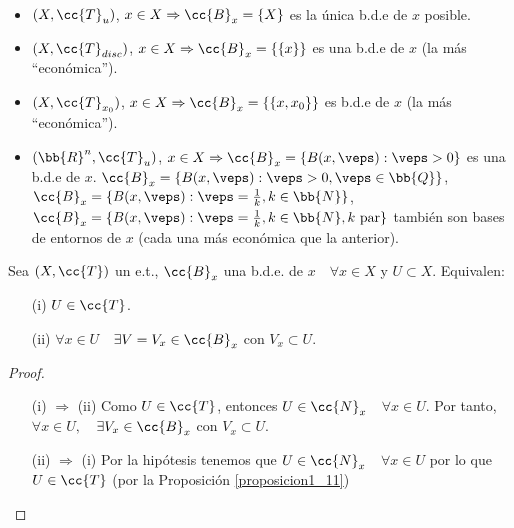 \begin{ejemplo}\
    \begin{itemize}
        \item $(X, \cc{T}_u)$, $x\in X\Rightarrow \cc{B}_x=\{X\}$ es la única b.d.e de $x$ posible.
        \item $(X, \cc{T}_{disc})$, $x \in X \Rightarrow \cc{B}_x=\{\{x\}\}$ es una b.d.e de $x$ (la más ``económica'').
        \item $(X, \cc{T}_{x_0})$, $x \in X \Rightarrow \cc{B}_x = \{\{x,x_0\}\}$ es b.d.e de $x$ (la más ``económica'').
        \item $(\bb{R}^n, \cc{T}_u)$, $x \in X\Rightarrow \cc{B}_x = \{B(x, \veps): \veps > 0\}$ es una b.d.e de $x$. $\cc{B}_x = \{B(x, \veps):\veps > 0 , \veps \in \bb{Q}\}$, $\cc{B}_x = \{B(x, \veps):\veps =\frac{1}{k}, k\in \bb{N}\}$, $\cc{B}_x = \{B(x, \veps):\veps =\frac{1}{k}, k\in \bb{N}, k\text{ par}\}$ también son bases de entornos de $x$ (cada una más económica que la anterior).
    \end{itemize}
    \endsquare
\end{ejemplo}

\begin{prop}
    Sea $(X,\cc{T})$ un e.t., $\cc{B}_x$ una b.d.e. de $x$\ \ $\forall x \in X$ y $U\subset X$. Equivalen:
    \begin{enumerate}
        \item[(i)] $U\in \cc{T}$.
        \item[(ii)] $\forall x \in U$\ \ $\exists V = V_x\in \cc{B}_x$ con $V_x\subset U$. 
    \end{enumerate}

    \begin{proof}\ 
        \begin{itemize}
            \item[(i) $\Rightarrow$ (ii)] Como $U\in \cc{T}$, entonces $U\in \cc{N}_x$\ \ $\forall x \in U$. Por tanto, $\forall x \in U,$\ \ $\exists V_x\in \cc{B}_x$ con $V_x\subset U$.
            \item[(ii) $\Rightarrow$ (i)] Por la hipótesis tenemos que $U\in \cc{N}_x$\ \ $\forall x \in U$ por lo que $U\in \cc{T}$ (por la Proposición \ref{proposicion1_11})
        \end{itemize}
    \end{proof}
\end{prop}


